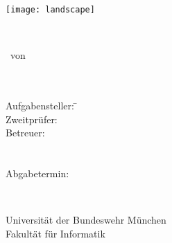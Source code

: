 \begin{center}

\vspace*{1cm}

\texttt{[image: landscape]}

\vspace{1.5cm}
{\Huge %
\textbf{\Dtitel}\\ %
} %
\vspace{1.5cm}


{\Large %
\Darbeit \ von\\ %
\Dname\\ %
\Dnummer\\ %
}%
\vspace{2cm}

\parbox{1cm}{
\begin{large}
\begin{tabbing}
Aufgabensteller: \hspace{.5cm} \= \Dprofa \\[2mm]
Zweitprüfer: \> \Dprofb \\[2mm]
Betreuer:
\> \Dbetreuera \\ %
\> \Dbetreuerb \\
\> \Dbetreuerc \\[5mm]
Abgabetermin: \> \Dday \\
\end{tabbing}
\end{large}}\\
\vspace{5mm}

\vfill

{\Large %
Universität der Bundeswehr München\\
Fakultät für Informatik\\
}

\end{center}

